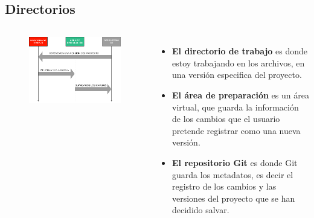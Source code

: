 \documentclass{beamer}
\begin{document}
\subsection{Directorios}
\begin{frame}
\begin{columns}
 \begin{figure}
 \centering
 \includegraphics[scale=0.24]{Imagenes/3_states}
 \end{figure}
    \footnotesize
  \begin{itemize}
  \item \textbf{El directorio de trabajo} es donde estoy trabajando en los archivos, en una versión especifica del proyecto.
  \item \textbf{El área de preparación} es un área virtual, que guarda la información de los cambios que el usuario pretende registrar como una nueva versión.
  \item \textbf{El repositorio Git} es donde Git guarda los metadatos, es decir el registro de los cambios y las versiones del proyecto que se han decidido salvar.
  \end{itemize}
  \end{columns}
\end{frame}
\end{document}
